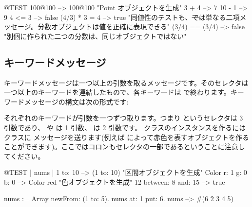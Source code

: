 \documentclass[a4paper,10pt,twoside]{book}
\begin{document}
\begin{code}{@TEST}
100@100      --> 100@100  "Point オブジェクトを生成"
3 + 4              --> 7
10 - 1            --> 9
4 <= 3            --> false
(4/3) * 3 = 4   --> true  "同値性のテストも、\st では単なる二項メッセージ。分数オブジェクトは値を正確に表現できる"
(3/4) == (3/4) --> false  "別個に作られた二つの分数は、同じオブジェクトではない"
\end{code}


\subsection{キーワードメッセージ}

キーワードメッセージは一つ以上の引数を取るメッセージです。そのセレクタは一つ以上のキーワードを連結したもので、各キーワードは \ct{:} で終わります。キーワードメッセージの構文は次の形式です:

それぞれのキーワードが引数を一つずつ取ります。つまり というセレクタは 3 引数であり、 や  は 1 引数、 は 2 引数です。 クラスのインスタンスを作るにはクラスに  メッセージを送ります(例えば  によって赤色を表すオブジェクトを作ることができます)。ここではコロンもセレクタの一部であるということに注意してください。


\begin{code}{@TEST | nums |}
1 to: 10                        --> (1 to: 10)  "区間オブジェクトを生成"
Color r: 1 g: 0 b: 0       --> Color red  "色オブジェクトを生成"
12 between: 8 and: 15 --> true

nums := Array newFrom: (1 to: 5).
nums at: 1 put: 6.
nums --> #(6 2 3 4 5)
\end{code}
\end{document}
